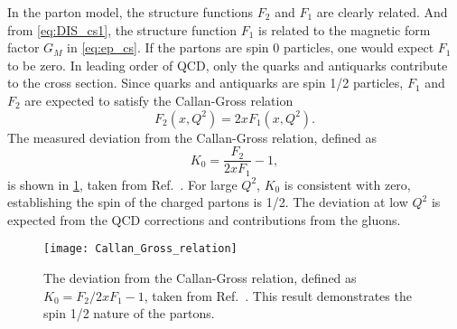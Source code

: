 \documentclass[../main.tex]{subfiles}
\begin{document}
In the parton model, the structure functions $F_2$ and $F_1$ are clearly related. And
from \cref{eq:DIS_cs1}, the structure function $F_1$ is
related to the magnetic form factor $G_M$ in \cref{eq:ep_cs}. If the partons
are spin 0 particles, one would expect $F_1$ to be zero. In leading order of QCD,
only the quarks and antiquarks contribute to the cross section. Since quarks and
antiquarks are spin 1/2 particles, $F_1$ and $F_2$ are expected to satisfy the Callan-Gross
relation~\cite{callan1968,callan1969}
\begin{equation}
	F_2\left(x,Q^2\right) = 2x F_1\left(x,Q^2\right).
	\label{eq:CS_relation}
\end{equation}
The measured deviation from the Callan-Gross relation, defined as
\begin{equation}
	K_0 = \frac{F_2}{2xF_1}-1,
\end{equation}
is shown in \cref{fig:callan_gross}, taken from Ref.~\cite{kendall1991}.
For large $Q^2$, $K_0$ is consistent with zero, establishing the spin of the
charged partons is 1/2.
The deviation at low $Q^2$ is expected from the QCD corrections and contributions from
the gluons.
\begin{figure}[htbp!]
	\centering
	\texttt{[image: Callan\_Gross\_relation]}
	\caption{The deviation from the Callan-Gross relation, defined as
		$K_0=F_2/2xF_1 -1$, taken from Ref.~\cite{kendall1991}. This result
		demonstrates the spin 1/2 nature of the partons.}
	\label{fig:callan_gross}
\end{figure}
\end{document}
